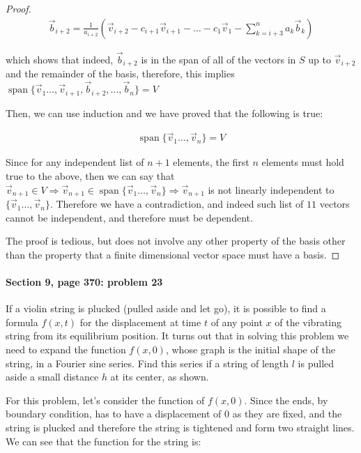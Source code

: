\documentclass{article}
\DeclareMathOperator{\spn}{span}
\begin{document}
\begin{proof}
\begin{align*}
\vec{b}_{i+2} = \frac{1}{a_{i+2}}(\vec{v}_{i+2} - c_{i+1} \vec{v}_{i+1} - \ldots - c_1 \vec{v}_1 - \sum_{k=i+3}^{n} a_k \vec{b}_k)
\end{align*}

which shows that indeed, $\vec{b}_{i+2}$ is in the span of all of the vectors in $S$ up to $\vec{v}_{i+2}$ and the remainder of the basis, therefore, this implies $\spn{\{ \vec{v}_1 \ldots, \vec{v}_{i+1} , \vec{b}_{i+2}, \ldots, \vec{b}_n \}}=V$

Then, we can use induction and we have proved that the following is true:

\begin{align*}
\spn{\{ \vec{v}_1 \ldots, \vec{v}_{n} \}} = V
\end{align*}

Since for any independent list of $n+1$ elements, the first $n$ elements must hold true to the above, then we can say that $\vec{v}_{n+1} \in V \Rightarrow \vec{v}_{n+1} \in \spn{\{ \vec{v}_1 \ldots, \vec{v}_{n} \}} \Rightarrow \vec{v}_{n+1}$ is not linearly independent to $\{ \vec{v}_1 \ldots, \vec{v}_{n} \}$. Therefore we have a contradiction, and indeed such list of $11$ vectors cannot be independent, and therefore must be dependent.

The proof is tedious, but does not involve any other property of the basis other than the property that a finite dimensional vector space must have a basis.
\end{proof}


\paragraph{Section 9, page 370: problem 23}

If a violin string is plucked (pulled aside and let go), it is possible to find a formula $f(x, t)$ for the displacement at time $t$ of any point $x$ of the vibrating string from its equilibrium position. It turns out that in solving this problem we need to expand the function $f(x, 0)$, whose graph is the initial shape of the string, in a Fourier sine series. Find this series if a string of length $l$ is pulled aside a small distance $h$ at its center, as shown.

For this problem, let's consider the function of $f(x,0)$. Since the ends, by boundary condition, has to have a displacement of 0 as they are fixed,  and the string is plucked and therefore the string is tightened and form two straight lines. We can see that the function for the string is:
\end{document}
